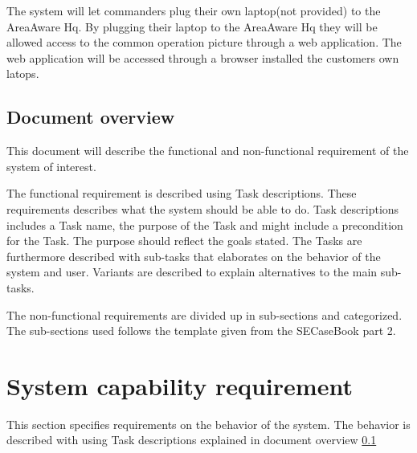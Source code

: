 The system will let commanders plug their own laptop(not provided) to the AreaAware Hq. By plugging their laptop to the AreaAware Hq they will be allowed access to the common operation picture through a web application. The web application will be accessed through a browser installed the customers own latops.

\subsection{Document overview}
\label{sec_documentOverview}
This document will describe the functional and non-functional requirement of the system of interest. 

The functional requirement is described using Task descriptions. These requirements describes what the system should be able to do. Task descriptions includes a Task name, the purpose of the Task and might include a precondition for the Task. The purpose should reflect the goals stated. The Tasks are furthermore described with sub-tasks that elaborates on the behavior of the system and user.  Variants are described to explain alternatives to the main sub-tasks. \citep{taskDescription}

The non-functional requirements are divided up in sub-sections and categorized. The sub-sections used follows the template given from the SECaseBook part 2. \citep{casebook}



\newpage
\section{System capability requirement}
This section specifies requirements on the behavior of the system. The behavior is described with using Task descriptions explained in document overview \ref{sec_documentOverview}

